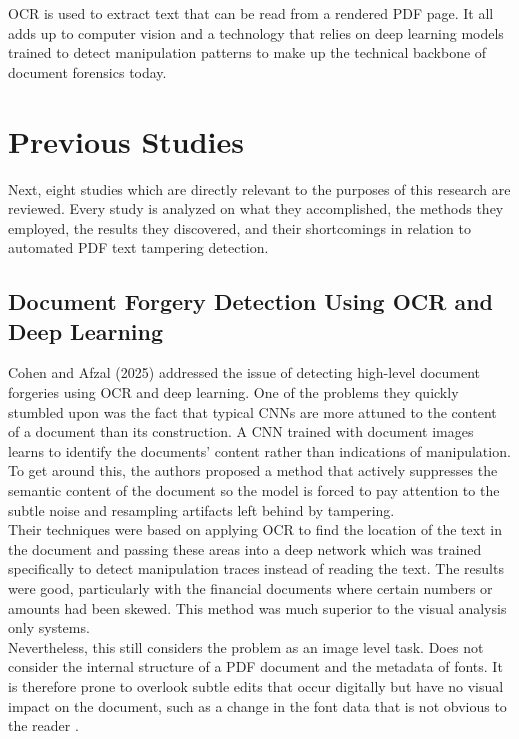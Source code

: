 \noindent OCR is used to extract text that can be read from a rendered PDF page. It all adds up to computer vision and a technology that relies on deep learning models trained to detect manipulation patterns to make up the technical backbone of document forensics today.\\

\section{Previous Studies}

\noindent Next, eight studies which are directly relevant to the purposes of this research are reviewed. Every study is analyzed on what they accomplished, the methods they employed, the results they discovered, and their shortcomings in relation to automated PDF text tampering detection.\\

\subsection{Document Forgery Detection Using OCR and Deep Learning}

\noindent Cohen and Afzal (2025) addressed the issue of detecting high-level document forgeries using OCR and deep learning. One of the problems they quickly stumbled upon was the fact that typical CNNs are more attuned to the content of a document than its construction. A CNN trained with document images learns to identify the documents' content rather than indications of manipulation. To get around this, the authors proposed a method that actively suppresses the semantic content of the document so the model is forced to pay attention to the subtle noise and resampling artifacts left behind by tampering.\\

\noindent Their techniques were based on applying OCR to find the location of the text in the document and passing these areas into a deep network which was trained specifically to detect manipulation traces instead of reading the text. The results were good, particularly with the financial documents where certain numbers or amounts had been skewed. This method was much superior to the visual analysis only systems.\\

\noindent Nevertheless, this still considers the problem as an image level task. Does not consider the internal structure of a PDF document and the metadata of fonts. It is therefore prone to overlook subtle edits that occur digitally but have no visual impact on the document, such as a change in the font data that is not obvious to the reader \cite{Cohen2025Forgery}.\\

